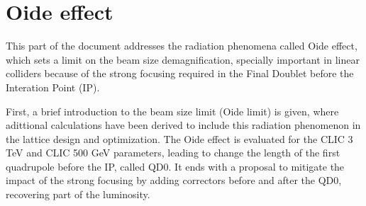 \chapter{Oide effect}
This part of the document addresses the radiation phenomena called Oide effect\cite{Oide}, which sets a limit on the beam size demagnification, specially important in linear colliders because of the strong focusing required in the Final Doublet before the Interation Point (IP).\par
First, a brief introduction to the beam size limit (Oide limit) is given, where adittional calculations have been derived to include this radiation phenomenon in the lattice design and optimization. The Oide effect is evaluated for the CLIC 3 TeV and CLIC 500 GeV parameters, leading to change the length of the first quadrupole before the IP, called QD0. It ends with a proposal to mitigate the impact of the strong focusing by adding correctors before and after the QD0, recovering part of the luminosity.\par
